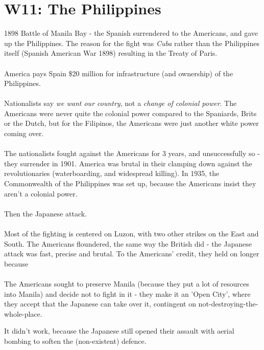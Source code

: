 \documentclass[a4paper]{article}
\begin{document}
\section{W11: The Philippines}
1898 Battle of Manila Bay - the Spanish surrendered to the Americans, and gave up the Philippines. The reason for the fight was \textit{Cuba} rather than the Philippines itself (Spanish American War 1898) resulting in the Treaty of Paris.\\
\\
America pays Spain \$20 million for infrastructure (and ownership) of the Philippines.\\
\\
Nationalists say \textit{we want our country}, not a \textit{change of colonial power}. The Americans were never quite the colonial power compared to the Spaniards, Brits or the Dutch, but for the Filipinos, the Americans were just another white power coming over.\\
\\
The nationalists fought against the Americans for 3 years, and unsuccessfully so - they surrender in 1901. America was brutal in their clamping down against the revolutionaries (waterboarding, and widespread killing). In 1935, the Commonwealth of the Philippines was set up, because the Americans insist they aren't a colonial power.\\
\\
Then the Japanese attack.\\
\\
Most of the fighting is centered on Luzon, with two other strikes on the East and South. The Americans floundered, the same way the British did - the Japanese attack was fast, precise and brutal. To the Americans' credit, they held on longer because\\
\\
The Americans sought to preserve Manila (because they put a lot of resources into Manila) and decide not to fight in it - they make it an 'Open City', where they accept that the Japanese can take over it, contingent on not-destroying-the-whole-place.

\begin{displayquote}
	It didn't work, because the Japanese still opened their assault with aerial bombing to soften the (non-existent) defence.
\end{displayquote}
\end{document}
